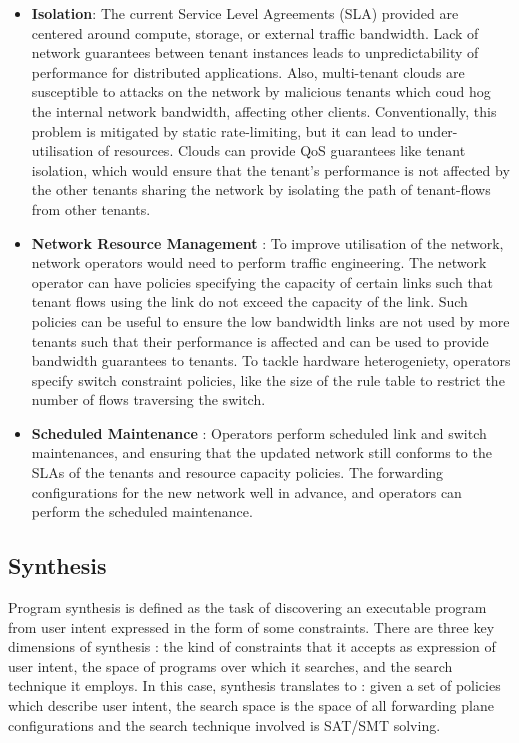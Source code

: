 \documentclass[]{sig}
\begin{document}
\begin{itemize}
	\item \textbf{Isolation}: The current Service Level Agreements (SLA) provided are centered around compute, storage, or external traffic bandwidth. Lack of network guarantees between tenant instances leads to unpredictability of performance for distributed applications. Also, multi-tenant clouds are susceptible to attacks on the network by malicious tenants which coud hog the internal network bandwidth, affecting other clients. Conventionally, this problem is mitigated by static rate-limiting, but it can lead to under-utilisation of resources. Clouds can provide QoS guarantees like tenant isolation, which would ensure that the tenant's performance is not affected by the other tenants sharing the network by isolating the path of tenant-flows from other tenants. 
	\item \textbf{Network Resource Management} : To improve utilisation of the network, network operators would need to perform traffic engineering. The network operator can have policies specifying the capacity of certain links such that tenant flows using the link do not exceed the capacity of the link. Such policies can be useful to ensure the low bandwidth links are not used by more tenants such that their performance is affected and can be used to provide bandwidth guarantees to tenants. To tackle hardware heterogeniety, operators specify switch constraint policies, like the size of the rule table to restrict the number of flows traversing the switch. 
	\item \textbf{Scheduled Maintenance} : Operators perform scheduled link and switch maintenances, and ensuring that the updated network still conforms to the SLAs of the tenants and resource capacity policies. The forwarding configurations for the new network well in advance, and operators can perform the scheduled maintenance. 
\end{itemize}

\subsection{Synthesis} \label{sec:synthesis}
Program synthesis is defined as the task of discovering an executable program from user intent expressed in the form of some constraints. There are three key dimensions of synthesis : the kind of constraints that it accepts as expression of user intent, the space of programs over which it searches, and the search technique it employs. In this case, synthesis translates to : given a set of policies which describe user intent, the search space is the space of all forwarding plane configurations and the search technique involved is SAT/SMT solving. 
\end{document}
